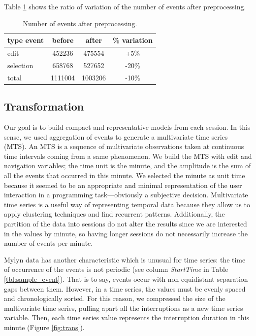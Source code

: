 \documentclass[times]{smrauth}
\begin{document}
 Table \ref{tbl:mass_events} shows the ratio of variation of the number of events after preprocessing.
 
 \begin{table}[hb!]
 \tiny
 \renewcommand{\arraystretch}{1.3}
 \caption{Number of events after preprocessing.}
 \label{tbl:mass_events}
 \centering
 \begin{tabular}{l | c | c | c } 
   type event & before & after & \% variation  \\  
   \hline 
   edit &	 452236 & 475554 &	+5\%   \\
   selection &	658768 & 527652 & -20\%   \\
   \hline
   total & 1111004 & 1003206 & -10\%  \\
 \end{tabular}
 \end{table}

\subsection{Transformation}
Our goal is to build compact and representative models from each session. In this sense, we used aggregation of events to generate a multivariate time series (MTS). An MTS is a sequence of multivariate observations taken at continuous time intervals coming from a same phenomenon. We build the MTS with edit and navigation variables; the time unit is the minute, and the amplitude is the sum of all the events that occurred in this minute. We selected the minute as unit time because it seemed to be an appropriate and minimal representation of the user interaction in a programming task---obviously a subjective decision. Multivariate time series is a useful way of representing temporal data because they allow us to apply clustering techniques and find recurrent patterns. Additionally, the partition of the data into sessions do not alter the results since we are interested in the values by minute, so having longer sessions do not necessarily increase the number of events per minute.


Mylyn data has another characteristic which is unusual for time series: the time of occurrence of the events is not periodic (see column \textit{StartTime} in Table \ref{tbl:sample_event}). That is to say, events occur with non-equidistant separation gaps between them. However, in a time series, the values must be evenly spaced and chronologically sorted. For this reason, we compressed the size of the multivariate time series, pulling apart all the interruptions as a new time series variable. Then, each time series value represents the interruption duration in this minute (Figure \ref{fig:trans}). 
\end{document}
